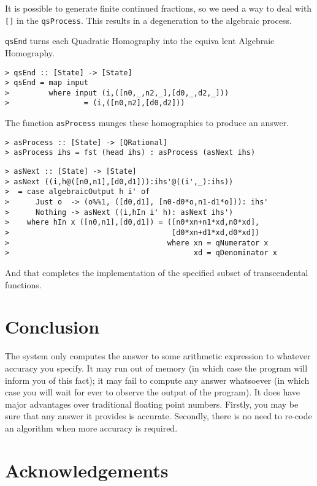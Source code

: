 It is possible to generate finite continued fractions, so we need a
way to deal with \mbox{\tt []} in the \mbox{\tt qsProcess}. 
This results in a
degeneration to the algebraic process.

\mbox{\tt qsEnd} turns each Quadratic Homography into the equiva
lent Algebraic
Homography.
\begin{verbatim}
> qsEnd :: [State] -> [State]
> qsEnd = map input
>         where input (i,([n0,_,n2,_],[d0,_,d2,_]))
>                 = (i,([n0,n2],[d0,d2]))
\end{verbatim}
%
%
The function \mbox{\tt asProcess} munges these homographies 
to produce an answer.
\begin{verbatim}
> asProcess :: [State] -> [QRational]
> asProcess ihs = fst (head ihs) : asProcess (asNext ihs)
\end{verbatim}
%
%
\begin{verbatim}
> asNext :: [State] -> [State]
> asNext ((i,h@([n0,n1],[d0,d1])):ihs'@((i',_):ihs))
>  = case algebraicOutput h i' of
>      Just o  -> (o%%1, ([d0,d1], [n0-d0*o,n1-d1*o])): ihs'
>      Nothing -> asNext ((i,hIn i' h): asNext ihs')
>    where hIn x ([n0,n1],[d0,d1]) = ([n0*xn+n1*xd,n0*xd],
>                                     [d0*xn+d1*xd,d0*xd])
>                                    where xn = qNumerator x
>                                          xd = qDenominator x
\end{verbatim}
%
%
And that completes the implementation of the specified subset of
transcendental functions.

\section{Conclusion}

The system only computes the answer to some arithmetic expression to
whatever accuracy you specify. It may run out of memory (in which case
the program will inform you of this fact); it may fail to compute any
answer whatsoever (in which case you will wait for ever to observe
the output of the program). It does have major advantages over
traditional floating point numbers.  Firstly, you may be sure that any
answer it provides is accurate. Secondly, there is no need to re-code
an algorithm when more accuracy is required.

\section{Acknowledgements}

